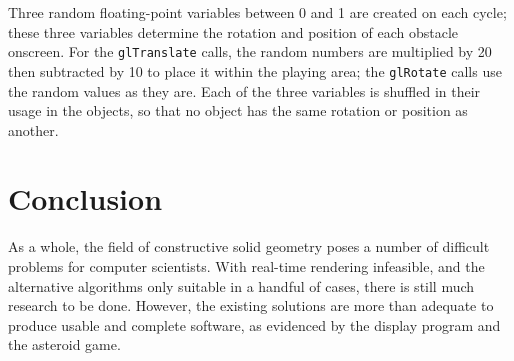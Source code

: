 \documentclass[12pt]{article}
\begin{document}
\begin{doublespace}
Three random floating-point variables between 0 and 1 are created on each cycle; these three variables determine the rotation and position of each obstacle onscreen. For the \texttt{glTranslate} calls, the random numbers are multiplied by 20 then subtracted by 10 to place it within the playing area; the \texttt{glRotate} calls use the random values as they are. Each of the three variables is shuffled in their usage in the objects, so that no object has the same rotation or position as another.
\section{Conclusion}
As a whole, the field of constructive solid geometry poses a number of difficult problems for computer scientists. With real-time rendering infeasible, and the alternative algorithms only suitable in a handful of cases, there is still much research to be done. However, the existing solutions are more than adequate to produce usable and complete software, as evidenced by the display program and the asteroid game.
\newpage
\end{doublespace}
\end{document}
